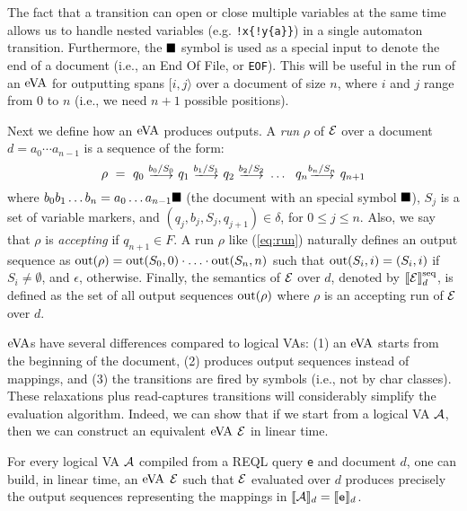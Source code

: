 The fact that a transition can open or close multiple variables at the same time
allows us to handle nested variables (e.g. \texttt{!x\{!y\{a\}\}}) in a single
automaton transition. Furthermore, the $\blacksquare$ symbol is used as a special
input to denote the end of a document (i.e., an End Of File, or \texttt{EOF}).
This will be useful in the run of an $\mathrm{eVA}$ for outputting spans $[i, j\rangle$
over a document of size $n$, where $i$ and $j$ range from $0$ to $n$ (i.e., we
need $n+1$ possible positions).

Next we define how an $\mathrm{eVA}$ produces outputs. A \emph{run} $\rho$ of $\mathcal{E}$ over
a document $d = a_0 \cdots a_{n-1}$ is a sequence of the form:
\begin{equation}\label{eq:run}
	\rho \ = \ q_0 \ \longtrans{b_0 / S_0} \ q_1 \ \longtrans{b_1 / S_1} \ q_2 \ \longtrans{b_2 / S_2} \ \ldots \ \ q_{n} \longtrans{b_{n} / S_n} \ q_{n+1}
\end{equation}
where $b_0 b_1 \ldots b_n = a_0 \ldots a_{n-1} \blacksquare$ (the document with an
special symbol $\blacksquare$), $S_j$ is a set of variable markers, and
$(q_j,b_{j},S_{j}, q_{j+1}) \in \delta$, for $0\leq j\leq n$. Also, we say that
$\rho$ is \emph{accepting} if $q_{n+1} \in F$. A run $\rho$ like (\ref{eq:run})
naturally defines an output sequence as $\operatorname{out}(\rho) = \operatorname{out}(S_0, 0) \cdot
\ldots \cdot \operatorname{out}(S_n, n)$ such that $\operatorname{out}(S_i, i) = (S_i, i)$ if $S_i \neq
\emptyset$, and $\epsilon$, otherwise. Finally, the semantics of $\mathcal{E}$ over $d$,
denoted by $\llbracket\mathcal{E}\rrbracket^{\operatorname{seq}}_d$, is defined as the set of all output sequences
$\operatorname{out}(\rho)$ where $\rho$ is an accepting run of $\mathcal{E}$ over $d$.

$\mathrm{eVA}$s have several differences compared to logical VAs: (1) an $\mathrm{eVA}$ starts
from the beginning of the document, (2) produces output sequences instead of
mappings, and (3) the transitions are fired by symbols (i.e., not by char
classes). These relaxations plus read-captures transitions will considerably
simplify the evaluation algorithm.  Indeed, we can show that if we start from a
logical VA $\mathcal{A}$, then we can construct an equivalent $\mathrm{eVA}$ $\mathcal{E}$ in linear
time. %
\begin{proposition}\label{prop:eVAconstruction}
	For every logical VA $\mathcal{A}$ compiled from a REQL query \texttt{e} and
	document $d$, one can build, in linear time, an $\mathrm{eVA}$ $\mathcal{E}$ such that $\mathcal{E}$
	evaluated over $d$ produces precisely the output sequences representing the
	mappings in $\llbracket\mathcal{A}\rrbracket_d = \llbracket\texttt{e}\rrbracket_d$.
\end{proposition}

